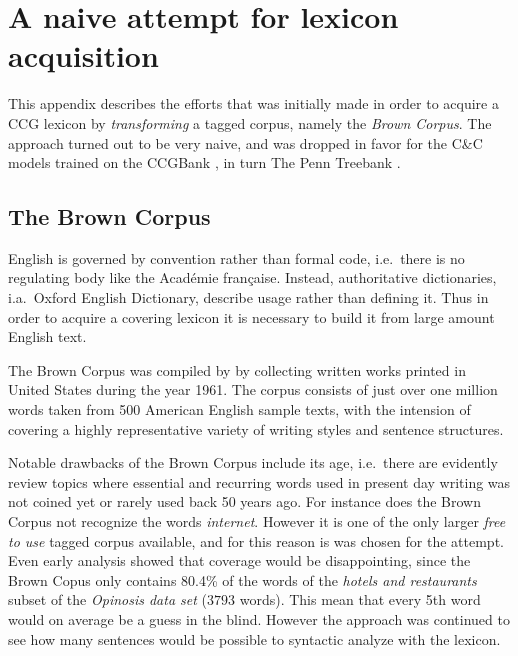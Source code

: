 \chapter{A naive attempt for lexicon acquisition}
\label{chap:brownCorpus}

This appendix describes the efforts that was initially made in order to acquire a CCG lexicon by \emph{transforming} a tagged corpus, namely the \emph{Brown Corpus}. The approach turned out to be very naive, and was dropped in favor for the C\&C models trained on the CCGBank \cite{ccgBank}, in turn The Penn Treebank \cite{pennTreebank}.

\section*{The Brown Corpus}
English is governed by convention rather than formal code, i.e.\ there is no regulating body like the Académie française. Instead, authoritative dictionaries, i.a.\  Oxford English Dictionary, describe usage rather than defining it. Thus in order to acquire a covering lexicon it is necessary to build it from large amount English text.

The Brown Corpus was compiled by \citeauthor{brown}  by collecting written works printed in United States during the year 1961. The corpus consists of just over one million words taken from 500 American English sample texts, with the intension of covering a highly representative variety of writing styles and sentence structures.

Notable drawbacks of the Brown Corpus include its age, i.e.\ there are evidently review topics where essential and recurring words used in present day writing was not coined yet or rarely used back 50 years ago. For instance does the Brown Corpus not recognize the words \emph{internet}. However it is one of the only larger \emph{free to use} tagged corpus available, and for this reason is was chosen for the attempt. Even early analysis showed that coverage would be disappointing, since the Brown Copus only contains 80.4\% of the words of the \emph{hotels and restaurants} subset of the \emph{Opinosis data set} \cite{Opinosis} ($\num{3793}$ words). This mean that every 5th word would on average be a guess in the blind. However the approach was continued to see how many sentences would be possible to syntactic analyze with the lexicon.

